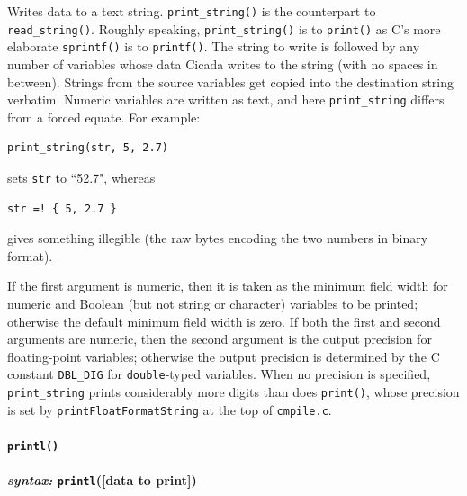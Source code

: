 \documentclass{article}
\newenvironment{code}{
       \begin{list}{}{
               \setlength{\leftmargin}{.4in}
               \setlength{\rightmargin}{0in}
               \setlength{\topsep}{.2in}
       }
       \small
       \item[] }
       { \end{list}   }
\begin{document}
Writes data to a text string.  \texttt{print\_string()} is the counterpart to \texttt{read\_string()}.  Roughly speaking, \texttt{print\_string()} is to \texttt{print()} as C's more elaborate \texttt{sprintf()} is to \texttt{printf()}.  The string to write is followed by any number of variables whose data Cicada writes to the string (with no spaces in between).  Strings from the source variables get copied into the destination string verbatim.  Numeric variables are written as text, and here \texttt{print\_string} differs from a forced equate.  For example: 

\begin{code} \begin{verbatim}
print_string(str, 5, 2.7)
\end{verbatim} \end{code}

\noindent sets \texttt{str} to ``52.7", whereas

\begin{code} \begin{verbatim}
str =! { 5, 2.7 }
\end{verbatim} \end{code}

\noindent gives something illegible (the raw bytes encoding the two numbers in binary format).

If the first argument is numeric, then it is taken as the minimum field width for numeric and Boolean (but not string or character) variables to be printed; otherwise the default minimum field width is zero.  If both the first and second arguments are numeric, then the second argument is the output precision for floating-point variables; otherwise the output precision is determined by the C constant \texttt{DBL\_DIG} for \texttt{double}-typed variables.  When no precision is specified, \texttt{print\_string} prints considerably more digits than does \texttt{print()}, whose precision is set by \verb#printFloatFormatString# at the top of \verb#cmpile.c#.\\

  




\paragraph{\texttt{printl()}\\\\
\normalfont \emph{syntax: } \texttt{printl}([data to print])\\\\}
\end{document}
